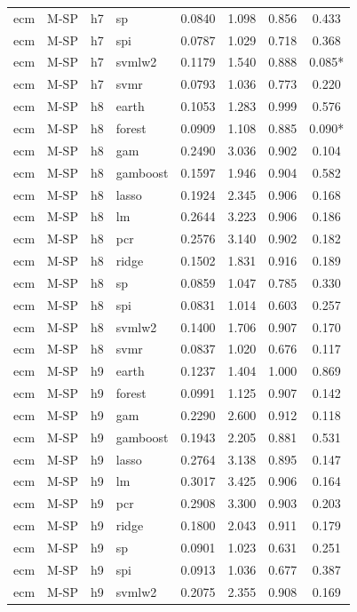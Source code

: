 \begin{ThreePartTable}
\begin{longtable}[t]{llclcccc}
ecm & M-SP & h7 & sp & 0.0840 & 1.098 & 0.856 & 0.433\\
ecm & M-SP & h7 & spi & 0.0787 & 1.029 & 0.718 & 0.368\\
ecm & M-SP & h7 & svmlw2 & 0.1179 & 1.540 & 0.888 & 0.085*\\
ecm & M-SP & h7 & svmr & 0.0793 & 1.036 & 0.773 & 0.220\\
\addlinespace
ecm & M-SP & h8 & earth & 0.1053 & 1.283 & 0.999 & 0.576\\
ecm & M-SP & h8 & forest & 0.0909 & 1.108 & 0.885 & 0.090*\\
ecm & M-SP & h8 & gam & 0.2490 & 3.036 & 0.902 & 0.104\\
ecm & M-SP & h8 & gamboost & 0.1597 & 1.946 & 0.904 & 0.582\\
ecm & M-SP & h8 & lasso & 0.1924 & 2.345 & 0.906 & 0.168\\
ecm & M-SP & h8 & lm & 0.2644 & 3.223 & 0.906 & 0.186\\
ecm & M-SP & h8 & pcr & 0.2576 & 3.140 & 0.902 & 0.182\\
ecm & M-SP & h8 & ridge & 0.1502 & 1.831 & 0.916 & 0.189\\
ecm & M-SP & h8 & sp & 0.0859 & 1.047 & 0.785 & 0.330\\
ecm & M-SP & h8 & spi & 0.0831 & 1.014 & 0.603 & 0.257\\
ecm & M-SP & h8 & svmlw2 & 0.1400 & 1.706 & 0.907 & 0.170\\
ecm & M-SP & h8 & svmr & 0.0837 & 1.020 & 0.676 & 0.117\\
\addlinespace
ecm & M-SP & h9 & earth & 0.1237 & 1.404 & 1.000 & 0.869\\
ecm & M-SP & h9 & forest & 0.0991 & 1.125 & 0.907 & 0.142\\
ecm & M-SP & h9 & gam & 0.2290 & 2.600 & 0.912 & 0.118\\
ecm & M-SP & h9 & gamboost & 0.1943 & 2.205 & 0.881 & 0.531\\
ecm & M-SP & h9 & lasso & 0.2764 & 3.138 & 0.895 & 0.147\\
ecm & M-SP & h9 & lm & 0.3017 & 3.425 & 0.906 & 0.164\\
ecm & M-SP & h9 & pcr & 0.2908 & 3.300 & 0.903 & 0.203\\
ecm & M-SP & h9 & ridge & 0.1800 & 2.043 & 0.911 & 0.179\\
ecm & M-SP & h9 & sp & 0.0901 & 1.023 & 0.631 & 0.251\\
ecm & M-SP & h9 & spi & 0.0913 & 1.036 & 0.677 & 0.387\\
ecm & M-SP & h9 & svmlw2 & 0.2075 & 2.355 & 0.908 & 0.169\\

\end{longtable}
\end{ThreePartTable}
